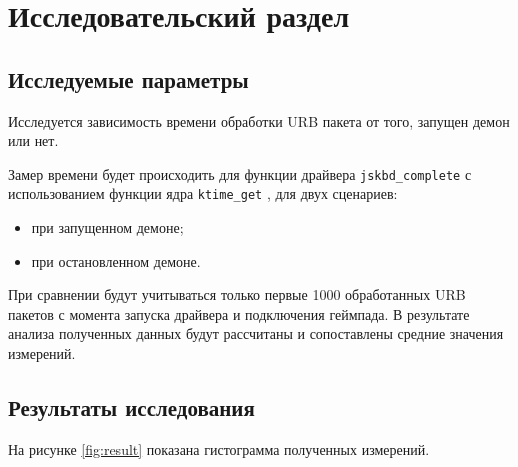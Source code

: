 \section{Исследовательский раздел}

\subsection{Исследуемые параметры}

Исследуется зависимость времени обработки URB пакета от того, запущен демон или нет.

Замер времени будет происходить для функции драйвера \texttt{jskbd\_complete} с использованием функции ядра \texttt{ktime\_get} \cite{ktime-get}, для двух сценариев:

\begin{itemize}[leftmargin=1.6\parindent]
    \item при запущенном демоне;
    \item при остановленном демоне.
\end{itemize}

При сравнении будут учитываться только первые 1000 обработанных URB пакетов с момента запуска драйвера и подключения геймпада. В результате анализа полученных данных будут рассчитаны и сопоставлены средние значения измерений.




\subsection{Результаты исследования}

На рисунке \ref{fig:result} показана гистограмма полученных измерений.

